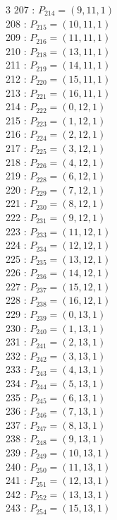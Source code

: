 \documentclass{article}
\begin{document}
{\begin{multicols}{3}
207 : $P_{214}=( 9, 11, 1 )$\\
208 : $P_{215}=( 10, 11, 1 )$\\
209 : $P_{216}=( 11, 11, 1 )$\\
210 : $P_{218}=( 13, 11, 1 )$\\
211 : $P_{219}=( 14, 11, 1 )$\\
212 : $P_{220}=( 15, 11, 1 )$\\
213 : $P_{221}=( 16, 11, 1 )$\\
214 : $P_{222}=( 0, 12, 1 )$\\
215 : $P_{223}=( 1, 12, 1 )$\\
216 : $P_{224}=( 2, 12, 1 )$\\
217 : $P_{225}=( 3, 12, 1 )$\\
218 : $P_{226}=( 4, 12, 1 )$\\
219 : $P_{228}=( 6, 12, 1 )$\\
220 : $P_{229}=( 7, 12, 1 )$\\
221 : $P_{230}=( 8, 12, 1 )$\\
222 : $P_{231}=( 9, 12, 1 )$\\
223 : $P_{233}=( 11, 12, 1 )$\\
224 : $P_{234}=( 12, 12, 1 )$\\
225 : $P_{235}=( 13, 12, 1 )$\\
226 : $P_{236}=( 14, 12, 1 )$\\
227 : $P_{237}=( 15, 12, 1 )$\\
228 : $P_{238}=( 16, 12, 1 )$\\
229 : $P_{239}=( 0, 13, 1 )$\\
230 : $P_{240}=( 1, 13, 1 )$\\
231 : $P_{241}=( 2, 13, 1 )$\\
232 : $P_{242}=( 3, 13, 1 )$\\
233 : $P_{243}=( 4, 13, 1 )$\\
234 : $P_{244}=( 5, 13, 1 )$\\
235 : $P_{245}=( 6, 13, 1 )$\\
236 : $P_{246}=( 7, 13, 1 )$\\
237 : $P_{247}=( 8, 13, 1 )$\\
238 : $P_{248}=( 9, 13, 1 )$\\
239 : $P_{249}=( 10, 13, 1 )$\\
240 : $P_{250}=( 11, 13, 1 )$\\
241 : $P_{251}=( 12, 13, 1 )$\\
242 : $P_{252}=( 13, 13, 1 )$\\
243 : $P_{254}=( 15, 13, 1 )$\\

\end{multicols}}
\end{document}
